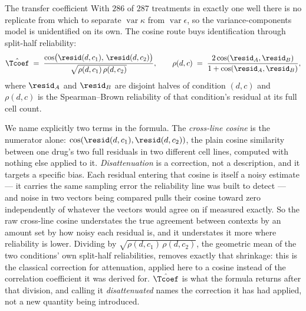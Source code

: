 \begin{defn}{The transfer coefficient}
With $\num{286}$ of $\num{287}$ treatments in exactly one well there is
no replicate from which to separate $\operatorname{var}\kappa$ from
$\operatorname{var}\epsilon$, so the variance-components model is unidentified on
its own. The cosine route buys identification through split-half reliability:
\begin{equation}
 \hat{\Tcoef} \;=\; \frac{\cos\!\big(\resid(d,c_1),\, \resid(d,c_2)\big)}
 {\sqrt{\rho(d,c_1)\,\rho(d,c_2)}},
 \qquad
 \rho(d,c) \;=\; \frac{2\cos(\resid_A, \resid_B)}{1 + \cos(\resid_A, \resid_B)},
\end{equation}
where $\resid_A$ and $\resid_B$ are disjoint halves of condition $(d,c)$ and
$\rho(d,c)$ is the Spearman--Brown reliability of that condition's residual at
its full cell count.
\end{defn}

We name explicitly two terms in the formula. The
\emph{cross-line cosine} is the numerator alone: $\cos(\resid(d,c_1), \resid(d,c_2))$,
the plain cosine similarity between one drug's two full residuals in two different
cell lines, computed with nothing else applied to it. \emph{Disattenuation} is a
correction, not a description, and it targets a specific bias. Each residual
entering that cosine is itself a noisy estimate --- it carries the same sampling
error the reliability line was built to detect --- and noise in two vectors being
compared pulls their cosine toward zero independently of whatever the vectors
would agree on if measured exactly. So the raw cross-line cosine understates the
true agreement between contexts by an amount set by how noisy each residual is,
and it understates it more where reliability is lower. Dividing by
$\sqrt{\rho(d,c_1)\,\rho(d,c_2)}$, the geometric mean of the two conditions' own
split-half reliabilities, removes exactly that shrinkage: this is the classical
correction for attenuation, applied here to a cosine instead of the correlation
coefficient it was derived for. $\hat{\Tcoef}$ is what the formula returns after
that division, and calling it \emph{disattenuated} names the correction it has had
applied, not a new quantity being introduced.

